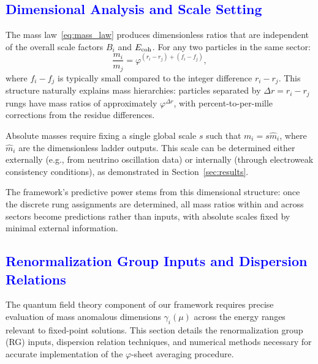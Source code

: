 \documentclass[%
amsmath,amssymb,
aps,
prb,
floatfix, showkeys, 10pt,
]{revtex4-2}
\newcommand{\modif}[1]{\textcolor{blue}{#1}}
\begin{document}
{\modif{ \subsection{Dimensional Analysis and Scale Setting}  }}
The mass law~\eqref{eq:mass_law} produces dimensionless ratios that are independent of the overall scale factors $B_i$ and $E_{\rm coh}$. For any two particles in the same sector:
\begin{equation}
\frac{m_i}{m_j} = \varphi^{(r_i - r_j) + (f_i - f_j)},
\label{eq:mass_ratio}
\end{equation}
where $f_i - f_j$ is typically small compared to the integer difference $r_i - r_j$. This structure naturally explains mass hierarchies: particles separated by $\Delta r = r_i - r_j$ rungs have mass ratios of approximately $\varphi^{\Delta r}$, with percent-to-per-mille corrections from the residue differences.

Absolute masses require fixing a single global scale $s$ such that $m_i = s \hat{m}_i$, where $\hat{m}_i$ are the dimensionless ladder outputs. This scale can be determined either externally (e.g., from neutrino oscillation data) or internally (through electroweak consistency conditions), as demonstrated in Section~\ref{sec:results}.

The framework's predictive power stems from this dimensional structure: once the discrete rung assignments are determined, all mass ratios within and across sectors become predictions rather than inputs, with absolute scales fixed by minimal external information.







{\modif{\section{Renormalization Group Inputs and Dispersion Relations}
\label{sec:running} }}
The quantum field theory component of our framework requires precise evaluation of mass anomalous dimensions $\gamma_i(\mu)$ across the energy ranges relevant to fixed-point solutions. This section details the renormalization group (RG) inputs, dispersion relation techniques, and numerical methods necessary for accurate implementation of the $\varphi$-sheet averaging procedure.
\end{document}
